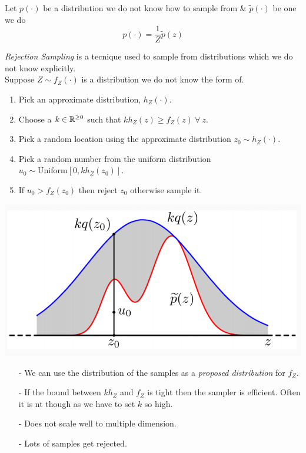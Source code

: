 \documentclass[11pt,a4paper]{article}
\begin{document}
\remark{}
Let $p(\cdot)$ be a distribution we do not know how to sample from \& $\tilde{p}(\cdot)$ be one we do
$$p(\cdot)=\frac{1}{Z}\tilde{p}(z)$$

\textit{Rejection Sampling} is a tecnique used to sample from distributions which we do not know explicitly.\\
Suppose $Z\sim f_Z(\cdot)$ is a distribution we do not know the form of.
\begin{enumerate}
	\item Pick an approximate distribution, $h_Z(\cdot)$.
	\item Choose a $k\in\mathbb{R}^{\geq0}$ such that $kh_Z(z)\geq f_Z(z)\ \forall\ z$.
	\item Pick a random location using the approximate distribution $z_0\sim h_Z(\cdot)$.
	\item Pick a random number from the uniform distribution $u_0\sim\text{Uniform}[0,kh_Z(z_0)]$.
	\item If $u_0>f_Z(z_0)$ then reject $z_0$ otherwise sample it.
\end{enumerate}
\includegraphics[scale=.4]{img/rejectionSampling.png}

\begin{itemize}
	\item[-] We can use the distribution of the samples as a \textit{proposed distribution} for $f_Z$.
	\item[-] If the bound between $kh_Z$ and $f_Z$ is tight then the sampler is efficient. Often it is nt though as we have to set $k$ so high.
	\item[-] Does not scale well to multiple dimension.
	\item[-] Lots of samples get rejected.
\end{itemize}
\end{document}
